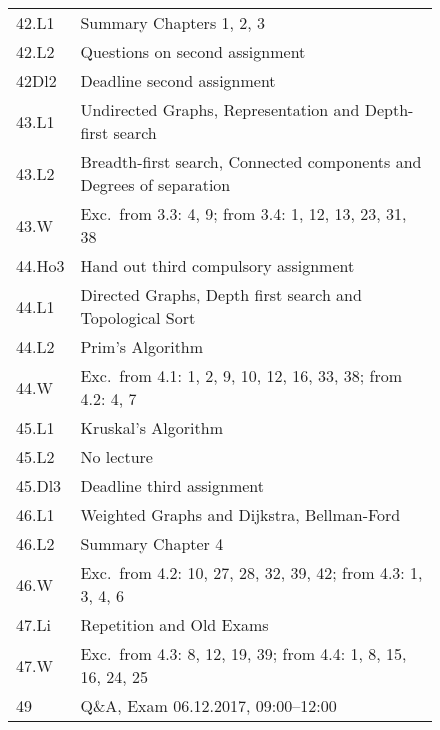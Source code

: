 \documentclass[11pt]{article}
\begin{document}
\begin{figure}[h]
\begin{tabular}{l | l}
        \hline
        42.L1 & Summary Chapters 1, 2, 3  \\
        42.L2 & Questions on second assignment\\
        42Dl2 & Deadline second assignment\\
        \hline
        43.L1 & Undirected Graphs, Representation and Depth-first search\\
        43.L2 & Breadth-first search, Connected components and Degrees of separation\\
        43.W  &  Exc.\ from 3.3: 4, 9; from 3.4: 1, 12, 13, 23, 31, 38 \\
        \hline
        44.Ho3& Hand out third compulsory assignment\\
        44.L1 & Directed Graphs, Depth first search and Topological Sort \\
        44.L2 & Prim's Algorithm \\
        44.W  &  Exc.\ from 4.1: 1, 2, 9, 10, 12, 16, 33, 38; from 4.2: 4, 7 \\
        \hline
        45.L1 & Kruskal's Algorithm \\
        45.L2 & No lecture\\
        45.Dl3 & Deadline third assignment\\
       \hline       
        46.L1 & Weighted Graphs and Dijkstra, Bellman-Ford \\
        46.L2 & Summary Chapter 4 \\
        46.W  &  Exc.\ from 4.2: 10, 27, 28, 32, 39, 42; from 4.3: 1, 3, 4, 6\\   
        \hline
        47.Li & Repetition and Old Exams\\
        47.W  &  Exc.\ from  4.3: 8, 12, 19, 39; from 4.4: 1, 8, 15, 16, 24, 25\\
        \hline
        49 & Q\&A, {\color{red}Exam 06.12.2017, 09:00--12:00} \\
        \hline
    \end{tabular}  
\end{figure}

\bigskip
\noindent
\end{document}
